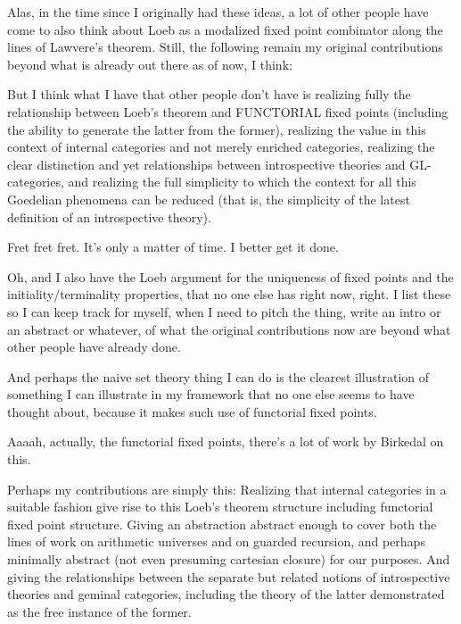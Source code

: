 Alas, in the time since I originally had these ideas, a lot of other people have come to also think about Loeb as a modalized fixed point combinator along the lines of Lawvere's theorem. Still, the following remain my original contributions beyond what is already out there as of now, I think:

But I think what I have that other people don't have is realizing fully the relationship between Loeb's theorem and FUNCTORIAL fixed points (including the ability to generate the latter from the former), realizing the value in this context of internal categories and not merely enriched categories, realizing the clear distinction and yet relationships between introspective theories and GL-categories, and realizing the full simplicity to which the context for all this Goedelian phenomena can be reduced (that is, the simplicity of the latest definition of an introspective theory).

Fret fret fret. It's only a matter of time. I better get it done.

Oh, and I also have the Loeb argument for the uniqueness of fixed points and the initiality/terminality properties, that no one else has right now, right. I list these so I can keep track for myself, when I need to pitch the thing, write an intro or an abstract or whatever, of what the original contributions now are beyond what other people have already done.

And perhaps the naive set theory thing I can do is the clearest illustration of something I can illustrate in my framework that no one else seems to have thought about, because it makes such use of functorial fixed points.


Aaaah, actually, the functorial fixed points, there's a lot of work by Birkedal on this.

Perhaps my contributions are simply this: Realizing that internal categories in a suitable fashion give rise to this Loeb's theorem structure including functorial fixed point structure. Giving an abstraction abstract enough to cover both the lines of work on arithmetic universes and on guarded recursion, and perhaps minimally abstract (not even presuming cartesian closure) for our purposes. And giving the relationships between the separate but related notions of introspective theories and geminal categories, including the theory of the latter demonstrated as the free instance of the former.